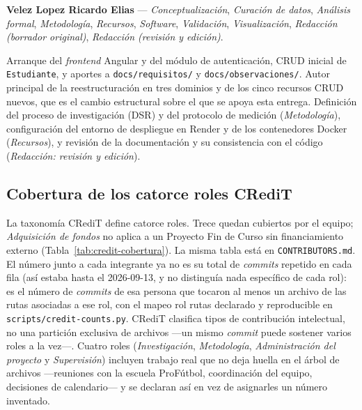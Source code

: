 \documentclass[11pt,a4paper]{article}
\newcommand{\ruta}[1]{\texttt{\footnotesize #1}}
\begin{document}
\textbf{Velez Lopez Ricardo Elias} — \emph{Conceptualización},
\emph{Curación de datos}, \emph{Análisis formal}, \emph{Metodología},
\emph{Recursos}, \emph{Software}, \emph{Validación}, \emph{Visualización},
\emph{Redacción (borrador original)}, \emph{Redacción (revisión y edición)}.

Arranque del \emph{frontend} Angular y del módulo de autenticación, CRUD
inicial de \texttt{Estudiante}, y aportes a \ruta{docs/requisitos/} y
\ruta{docs/observaciones/}. Autor principal de la reestructuración en tres
dominios y de los cinco recursos CRUD nuevos, que es el cambio estructural
sobre el que se apoya esta entrega. Definición del proceso de
investigación (DSR) y del protocolo de medición (\emph{Metodología}),
configuración del entorno de despliegue en Render y de los contenedores
Docker (\emph{Recursos}), y revisión de la documentación y su consistencia
con el código (\emph{Redacción: revisión y edición}).

\subsection{Cobertura de los catorce roles CRediT}

La taxonomía CRediT define catorce roles. Trece quedan cubiertos por el
equipo; \emph{Adquisición de fondos} no aplica a un Proyecto Fin de Curso
sin financiamiento externo (Tabla~\ref{tab:credit-cobertura}). La misma
tabla está en \ruta{CONTRIBUTORS.md}. El número junto a cada integrante
ya no es su total de \emph{commits} repetido en cada fila (así estaba
hasta el 2026-09-13, y no distinguía nada específico de cada rol): es el
número de \emph{commits} de esa persona que tocaron al menos un archivo
de las rutas asociadas a ese rol, con el mapeo rol\,\textrightarrow\,rutas
declarado y reproducible en \texttt{scripts/credit-counts.py}. CRediT
clasifica tipos de contribución intelectual, no una partición exclusiva
de archivos —un mismo \emph{commit} puede sostener varios roles a la
vez—. Cuatro roles (\emph{Investigación}, \emph{Metodología},
\emph{Administración del proyecto} y \emph{Supervisión}) incluyen trabajo
real que no deja huella en el árbol de archivos —reuniones con la
escuela ProFútbol, coordinación del equipo, decisiones de calendario— y
se declaran así en vez de asignarles un número inventado.
\end{document}
